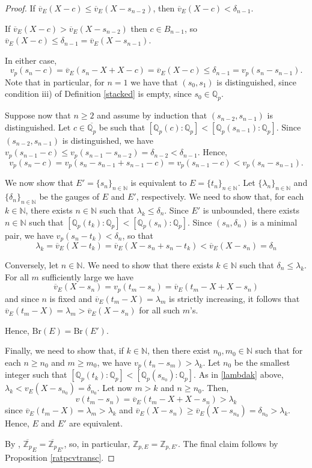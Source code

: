 \documentclass[10pt]{article}
\numberwithin{equation}{section}
\theoremstyle{definition}\newtheorem{Def}[equation]{Definition}
\theoremstyle{definition}\newtheorem{Ques}[equation]{Question}
\newcommand{\Q}{\mathbb{Q}}
\newcommand{\N}{\mathbb{N}}
\newcommand{\Z}{\mathbb{Z}}
\newcommand{\oQp}{\overline{\Q_p}}
\newcommand{\Br}{\text{Br}}
\newcommand{\oZp}{\overline{\Z_p}}
\begin{document}
\begin{proof}
If $\overline v_E(X-c)\leq \overline v_E(X-s_{n-2})$, then $\overline v_E(X-c)<\delta_{n-1}$.

If $\overline v_E(X-c)> \overline v_E(X-s_{n-2})$ then $c\in B_{n-1}$, so $ \overline v_E(X-c)\leq \delta_{n-1}=\overline v_E(X-s_{n-1})$.

In either case,
$$v_p(s_n-c)=\overline v_E(s_n-X+X-c)=\overline v_E(X-c)\leq\delta_{n-1}=v_p(s_n-s_{n-1}).$$
Note that in particular, for $n=1$ we have that $(s_0,s_1)$ is distinguished, since condition iii) of Definition \ref{stacked} is empty, since $s_0\in\Q_p$.

Suppose now that $n\geq 2$ and assume by induction that $(s_{n-2},s_{n-1})$ is distinguished. Let $c\in\oQp$ be such that $[\Q_p(c):\Q_p]<[\Q_p(s_{n-1}):\Q_p]$. Since $(s_{n-2},s_{n-1})$ is distinguished, we have $v_p(s_{n-1}-c)\leq v_p(s_{n-1}-s_{n-2})=\delta_{n-2}<\delta_{n-1}$. Hence, 
$$v_p(s_n-c)=v_p(s_n-s_{n-1}+s_{n-1}-c)=v_p(s_{n-1}-c)<v_p(s_n-s_{n-1}).$$

We now show that $E'=\{s_n\}_{n\in\N}$ is equivalent to $E=\{t_n\}_{n\in\N}$. Let $\{\lambda_n\}_{n\in\N}$ and  $\{\delta_n\}_{n\in\N}$ be the gauges of $E$ and $E'$, respectively. We need to show that, for each $k\in\N$, there exists $n\in \N$ such that $\lambda_k\leq\delta_{n}$. Since $E'$ is unbounded, there exists $n\in\N$ such that $[\Q_p(t_k):\Q_p]<[\Q_p(s_n):\Q_p]$. Since $(s_n,\delta_n)$ is a minimal pair,  we have $v_p(s_n-t_k)<\delta_n$, so that 
\begin{equation}\label{lambdak}
\lambda_k=\overline v_E(X-t_k)=\overline v_E(X-s_n+s_n-t_k)<\overline v_E(X-s_{n})=\delta_{n}
\end{equation}

Conversely, let $n\in\N$. We need to show that there exists $k\in \N$ such that $\delta_n\leq\lambda_k$. For all $m$ sufficiently large we have
$$\overline v_E(X-s_n)=v_p(t_m-s_n)=\overline v_E(t_m-X+X-s_n)$$
and since $n$ is fixed and $\overline v_E(t_m-X)=\lambda_m$ is strictly increasing, it follows that $\overline v_E(t_m-X)=\lambda_m>\overline v_E(X-s_n)$
for all such $m$'s. 

Hence,  $\Br(E)=\Br(E')$.

Finally, we need to show that, if $k\in\N$, then there exist $n_0,m_0\in\N$ such that for each $n\geq n_0$ and $m\geq m_0$, we have $v_p(t_n-s_m)>\lambda_k$. Let $n_0$ be the smallest integer such that $[\Q_p(t_k):\Q_p]<[\Q_p(s_{n_0}):\Q_p]$. As in \eqref{lambdak} above, $\lambda_k<v_E(X-s_{n_0})=\delta_{n_0}$.  Let now $m>k$ and $n\geq n_0$. Then,
$$v(t_m-s_n)=\overline v_E(t_m-X+X-s_n)>\lambda_k$$
since $\overline v_E(t_m-X)=\lambda_m>\lambda_k$ and $\overline v_E(X-s_n)\geq \overline v_E(X-s_{n_0})=\delta_{n_0}>\lambda_k$. Hence, $E$ and $E'$ are equivalent.

By \cite[Proposition 5.3]{PS2}, $\oZp_{E}=\oZp_{E'}$, so, in particular, $\Z_{p,E}=\Z_{p,E'}$. The final claim follows by Proposition \ref{ratpcvtransc}.
\end{proof}
\end{document}
